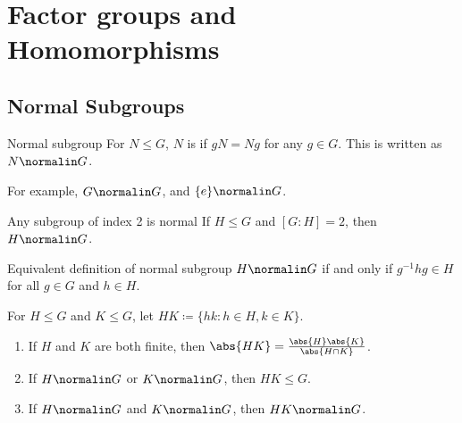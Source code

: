 \chapter{Factor groups and Homomorphisms}

\section{Normal Subgroups}

\begin{dfnbox}{Normal subgroup}{}
    For $N \leq G$, $N$ is  if $gN = Ng$ for any $g \in G$. This is written as $N \normalin G$.
\end{dfnbox}

For example, $G \normalin G$, and $\{e\} \normalin G$.

\begin{thmbox}{Any subgroup of index 2 is normal}{}
    If $H \leq G$ and $[G:H] = 2$, then $H \normalin G$.
\end{thmbox}

\begin{thmbox}{Equivalent definition of normal subgroup}{}
    $H \normalin G$ if and only if $g^{-1}hg \in H$ for all $g \in G$ and $h \in H$.
\end{thmbox}

\begin{thmbox}{}{}
    For $H \leq G$ and $K \leq G$, let $HK \coloneq \{ hk : h \in H, k \in K \}$.
    \begin{enumerate}
        \item If $H$ and $K$ are both finite, then $\abs{HK} = \frac{\abs{H}\abs{K}}{\abs{H \cap K}}$.
        \item If $H \normalin G$ or $K \normalin G$, then $HK \leq G$.
        \item If $H \normalin G$ and $K \normalin G$, then $HK \normalin G$.
    \end{enumerate}
\end{thmbox}



